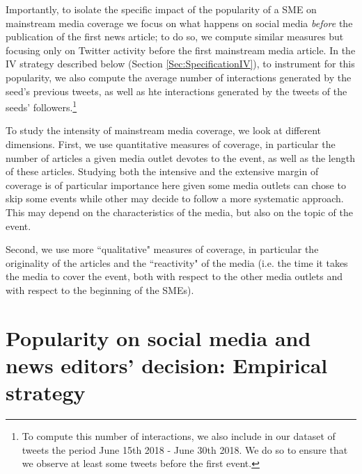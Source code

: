 Importantly, to isolate the specific impact of the popularity of a SME on mainstream media coverage we focus on what happens on social media \textit{before} the publication of the first news article; to do so, we compute similar measures but focusing only on Twitter activity before the first mainstream media article. In the IV strategy described below (Section \ref{Sec:SpecificationIV}), to instrument for this popularity, we also compute the average number of interactions generated by the seed's previous tweets, as well as hte interactions generated by the tweets of the seeds' followers.\footnote{To compute this number of interactions, we also include in our dataset of tweets the period June 15th 2018 - June 30th 2018. We do so to ensure that we observe at least some tweets before the first event.} 




To study the intensity of mainstream media coverage, we look at different dimensions. First, we use quantitative measures of coverage, in particular the number of articles a given media outlet devotes to the event, as well as the length of these articles. Studying both the intensive and the extensive margin of coverage is of particular importance here given some media outlets can chose to skip some events while other may decide to follow a more systematic approach. This may depend on the characteristics of the media, but also on the topic of the event.

Second, we use more ``qualitative" measures of coverage, in particular the originality of the articles \citep[following][]{CageHerveViaud2020} and the ``reactivity" of the media (i.e. the time it takes the media to cover the event, both with respect to the other media outlets and with respect to the beginning of the SMEs).



\section{Popularity on social media and news editors' decision: Empirical strategy\label{Sec:EmpiricalSpecification}}

